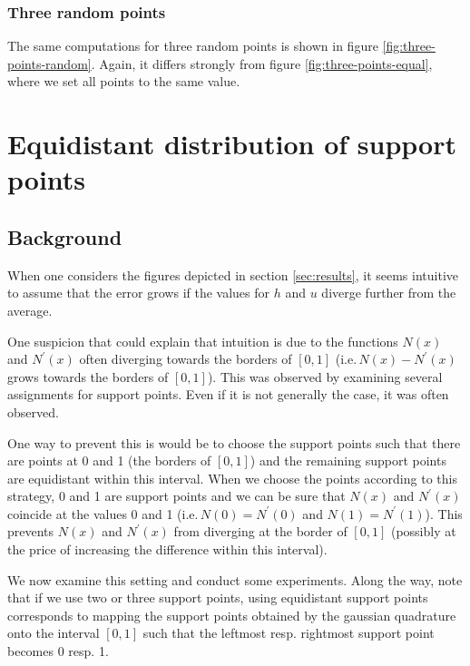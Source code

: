\documentclass{article}
\begin{document}


\subsubsection{Three random points}
\label{sec:three-random-points}

The same computations for three random points is shown in figure \ref{fig:three-points-random}. Again, it differs strongly from figure \ref{fig:three-points-equal}, where we set all points to the same value.



\section{Equidistant distribution of support points}
\label{sec:equidistant-distribution-of-support-points}

\subsection{Background}
\label{sec:equidistant-support-points-background}

When one considers the figures depicted in section \ref{sec:results}, it seems intuitive to assume that the error grows if the values for $h$ and $u$ diverge further from the average.

One suspicion that could explain that intuition is due to the functions $N\left(x\right)$ and $N^\prime\left(x\right)$ often diverging towards the borders of $[0,1]$ (i.e.\,$N(x)-N^\prime(x)$ grows towards the borders of $[0,1]$). This was observed by examining several assignments for support points. Even if it is not generally the case, it was often observed.

One way to prevent this is would be to choose the support points such that there are points at 0 and 1 (the borders of $[0,1]$) and the remaining support points are equidistant within this interval. When we choose the points according to this strategy, 0 and 1 are support points and we can be sure that $N\left(x\right)$ and $N^\prime\left(x\right)$ coincide at the values 0 and 1 (i.e.\,$N\left(0\right)=N^\prime\left(0\right)$ and $N\left(1\right)=N^\prime\left(1\right)$). This prevents $N(x)$ and $N^\prime(x)$ from diverging at the border of $[0,1]$ (possibly at the price of increasing the difference within this interval).

We now examine this setting and conduct some experiments. Along the way, note that if we use two or three support points, using equidistant support points corresponds to mapping the support points obtained by the gaussian quadrature onto the interval $[0,1]$ such that the leftmost resp. rightmost support point becomes 0 resp. 1.
\end{document}
